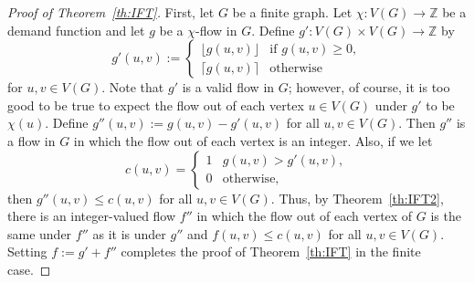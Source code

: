 \documentclass[12pt,a4paper]{amsart}
\numberwithin{equation}{section}
\theoremstyle{definition}
\begin{document}
\begin{proof}[Proof of Theorem~\ref{th:IFT}]
First, let $G$ be a finite graph. Let $\chi:V(G)\to \mathbb{Z}$ be a demand function and let $g$ be a $\chi$-flow in $G$. Define $g':V(G)\times V(G)\to \mathbb{Z}$ by
\[g'(u,v):=\begin{cases}\lfloor g(u,v)\rfloor&\text{if }g(u,v)\geq0,\\
\lceil g(u,v)\rceil & \text{otherwise}\end{cases}\]
for $u,v\in V(G)$. Note that $g'$ is a valid flow in $G$; however, of course, it is too good to be true to expect the flow out of each vertex $u\in V(G)$ under $g'$ to be $\chi(u)$. Define $g''(u,v):=g(u,v)-g'(u,v)$ for all $u,v\in V(G)$. Then $g''$ is a flow in $G$ in which the flow out of each vertex is an integer. Also, if we let 
\[c(u,v)=\begin{cases}1 &g(u,v)>g'(u,v),\\
0 &\text{otherwise},\end{cases}\]
then $g''(u,v)\leq c(u,v)$ for all $u,v\in V(G)$. Thus, by Theorem~\ref{th:IFT2}, there is an integer-valued flow $f''$ in which the flow out of each vertex of $G$ is the same under $f''$ as it is under $g''$ and $f(u,v)\leq c(u,v)$ for all $u,v\in V(G)$. Setting $f:=g'+f''$ completes the proof of Theorem~\ref{th:IFT} in the finite case. 


\end{proof}
\end{document}
